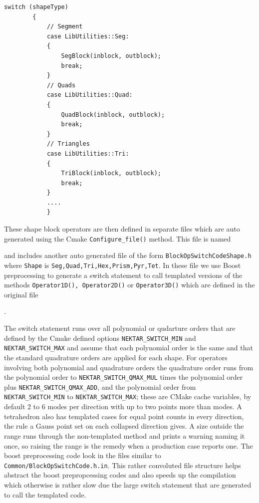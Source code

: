\begin{lstlisting}[style=C++Style]
        switch (shapeType)
        {
            // Segment
            case LibUtilities::Seg:
            {
                SegBlock(inblock, outblock);
                break;
            }
            // Quads
            case LibUtilities::Quad:
            {
                QuadBlock(inblock, outblock);
                break;
            }
            // Triangles
            case LibUtilities::Tri:
            {
                TriBlock(inblock, outblock);
                break;
            }
            ....
            }
\end{lstlisting}

These shape block operators are then defined in separate files which
are auto generated using the Cmake \texttt{Configure\_file()} method.
This file is named


\noindent and includes another auto generated file of the form
\texttt{BlockOpSwitchCodeShape.h} where \texttt{Shape} is
\texttt{Seg,Quad,Tri,Hex,Prism,Pyr,Tet}. In these file we use Boost
preprocessing to generate a switch statement to call templated
versions of the methods \texttt{Operator1D(), Operator2D()} or
\texttt{Operator3D()} which are defined in the original file

.

\noindent The switch statement runs over all polynomial or qudarture
orders that are defined by the Cmake defined options
\texttt{NEKTAR\_SWITCH\_MIN} and \texttt{NEKTAR\_SWITCH\_MAX} and
assume that each polynomial order is the same and that the standard
quadrature orders are applied for each shape. For operators involving
both polynomial and quadrature orders the quadrature order runs from
the polynomial order to \texttt{NEKTAR\_SWITCH\_QMAX\_MUL} times the
polynomial order plus \texttt{NEKTAR\_SWITCH\_QMAX\_ADD}, and the
polynomial order from \texttt{NEKTAR\_SWITCH\_MIN} to
\texttt{NEKTAR\_SWITCH\_MAX}; these are CMake cache variables, by default
2 to 6 modes per direction with up to two points more than modes. A
tetrahedron also has templated cases for equal point counts in every
direction, the rule a Gauss point set on each collapsed direction
gives. A size outside the range runs through the non-templated method
and prints a warning naming it once, so raising the range is the
remedy when a production case reports one. The boost
preprocessing code look in the files similar to
\texttt{Common/BlockOpSwitchCode.h.in}.  This rather convoluted file
structure helps abstract the boost prepropcessing codes and also
speeds up the compilation which otherwise is rather slow due the large
switch statement that are generated to call the templated code.

